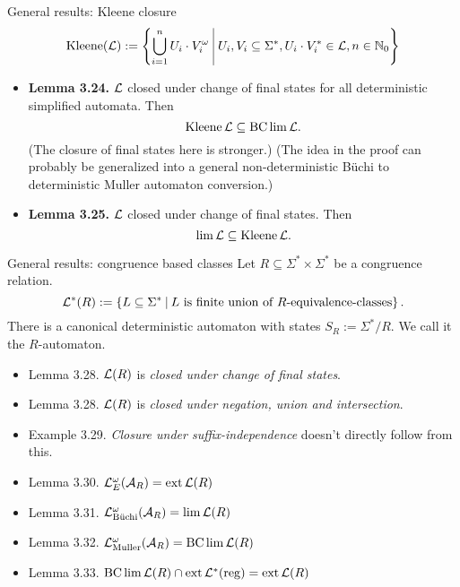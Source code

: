\documentclass[
	handout,
	notheorems,noamsthm]{beamer}
\begin{document}
\begin{frame}[<+->]{General results: Kleene closure}
\[ \Kleene(\Lang) := \Set{ \bigcup_{i=1}^n U_i \cdot V_i^\omega}{U_i, V_i \subseteq \Sigma^*, U_i \cdot V_i^* \in \Lang, n \in \N_0} \]

\begin{itemize}
\item \textbf{Lemma 3.24.} $\mathcal{L}$ closed under change of final states for all deterministic simplified automata. Then
\[ \operatorname{Kleene} \mathcal{L} \subseteq \operatorname{BC} \lim \mathcal{L} . \]
(The closure of final states here is stronger.) (The idea in the proof can probably be generalized into a general non-deterministic Büchi to deterministic Muller automaton conversion.)
\item \textbf{Lemma 3.25.} $\mathcal{L}$ closed under change of final states. Then
\[ \lim \mathcal{L} \subseteq \operatorname{Kleene} \mathcal{L} . \]
\end{itemize}
\end{frame}

\begin{frame}[<+->]{General results: congruence based classes}
Let $R\subseteq\Sigma^* \times \Sigma^*$ be a congruence relation.
\[ \Lang^*(R) := \Set{L \subseteq \Sigma^*}{L \text{ is finite union of $R$-equivalence-classes}} . \]
There is a canonical deterministic automaton with states $S_R := \Sigma^*/R$. We call it the $R$-automaton.

\begin{itemize}
\item Lemma 3.28. $\mathcal{L}(R)$ is \emph{closed under change of final states}.
\item Lemma 3.28. $\mathcal{L}(R)$ is \emph{closed under negation, union and intersection}.
\item Example 3.29. \emph{Closure under suffix-independence} doesn't directly follow from this.
%
\item Lemma 3.30. $\mathcal{L}^\omega_E(\mathcal{A}_R) = \operatorname{ext} \mathcal{L}(R)$
\item Lemma 3.31. $\mathcal{L}^\omega_{\text{Büchi}}(\mathcal{A}_R) = \lim \mathcal{L}(R)$
\item Lemma 3.32. $\mathcal{L}^\omega_{\text{Muller}}(\mathcal{A}_R) = \operatorname{BC} \lim \mathcal{L}(R)$
\item Lemma 3.33. $\operatorname{BC} \lim \mathcal{L}(R) \cap \operatorname{ext} \mathcal{L}^*(\textup{\textrm{reg}}) = \operatorname{ext} \mathcal{L}(R)$
\end{itemize}
\end{frame}
\end{document}
